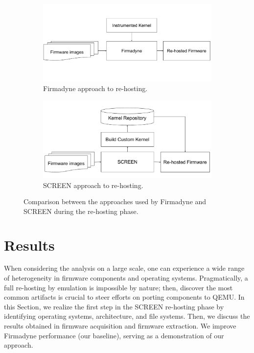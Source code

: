 \documentclass[12pt]{article}
\begin{document}
\begin{figure}[h]
     \centering
     \begin{subfigure}[b]{0.45\textwidth}
         \centering
         \includegraphics[width=\textwidth]{sebseg/Firmadyne-Approach.pdf}
         \caption{Firmadyne approach to re-hosting.}
         \label{fig:firmadyne-approach}
     \end{subfigure}
     \hfill
     \begin{subfigure}[b]{0.45\textwidth}
         \centering
         \includegraphics[width=\textwidth]{sebseg/SCREEN-Approach.pdf}
         \caption{SCREEN approach to re-hosting.}
         \label{fig:screen-approach}
     \end{subfigure}
        \caption{Comparison between the approaches used by Firmadyne and SCREEN during the re-hosting phase.}
        \label{fig:firmadyne-screen-compare}
\end{figure}

\section{Results}
\label{sec:results}

When considering the analysis on a large scale, one can experience a wide range of heterogeneity in firmware components and operating systems.  Pragmatically, a full re-hosting by emulation is impossible by nature; then, discover the most common artifacts is crucial to steer efforts on porting components to QEMU.  In this Section, we realize the first step in the SCREEN re-hosting phase by identifying operating systems, architecture, and file systems. Then, we discuss the results obtained in firmware acquisition and firmware extraction. We improve Firmadyne performance (our baseline), serving as a demonstration of our approach.
\end{document}
